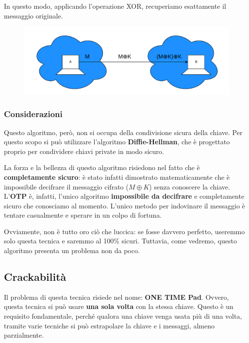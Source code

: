 \documentclass{rapport}
\begin{document}
In questo modo, applicando l'operazione XOR, recuperiamo esattamente il messaggio originale.  














\begin{figure}[h]
    \centering
    \includegraphics[width=0.9\linewidth]{logos/3_1cripto.pdf}
\end{figure}


\subsubsection{Considerazioni}

Questo algoritmo, però, non si occupa della condivisione sicura della chiave. Per questo scopo si può utilizzare l'algoritmo \textbf{Diffie-Hellman}, che è progettato proprio per condividere chiavi private in modo sicuro.  

La forza e la bellezza di questo algoritmo risiedono nel fatto che è \textbf{completamente sicuro}: è stato infatti dimostrato matematicamente che è impossibile decifrare il messaggio cifrato (\(M \oplus K\)) senza conoscere la chiave. L'\textbf{OTP} è, infatti, l'unico algoritmo \textbf{impossibile da decifrare} e completamente sicuro che conosciamo al momento. L'unico metodo per indovinare il messaggio è tentare casualmente e sperare in un colpo di fortuna.  

Ovviamente, non è tutto oro ciò che luccica: se fosse davvero perfetto, useremmo solo questa tecnica e saremmo al 100\% sicuri. Tuttavia, come vedremo, questo algoritmo presenta un problema non da poco.  




\subsection{Crackabilità}
Il problema di questa tecnica risiede nel nome: \textbf{ONE TIME Pad}. Ovvero, questa tecnica si può usare \textbf{una sola volta} con la stessa chiave. Questo è un requisito fondamentale, perché qualora una chiave venga usata più di una volta, tramite varie tecniche si può estrapolare la chiave e i messaggi, almeno parzialmente.  
\end{document}
